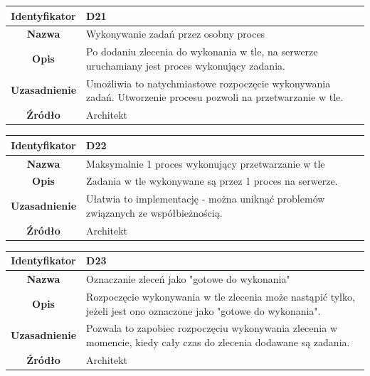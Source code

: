 \begin{table}[H]
\centering
\begin{tabular}{ | >{\bfseries}c | p{11cm} | }
\hline
%
Identyfikator & D21 \\ \hline
Nazwa & Wykonywanie zadań przez osobny proces \\ \hline
Opis & Po dodaniu zlecenia do wykonania w tle, na serwerze uruchamiany jest proces wykonujący zadania. \\ \hline
Uzasadnienie & Umożliwia to natychmiastowe rozpoczęcie wykonywania zadań. Utworzenie procesu pozwoli na przetwarzanie w tle. \\ \hline
Źródło & Architekt \\ \hline
%
\end{tabular}
\end{table}

\begin{table}[H]
\centering
\begin{tabular}{ | >{\bfseries}c | p{11cm} | }
\hline
%
Identyfikator & D22 \\ \hline
Nazwa & Maksymalnie 1 proces wykonujący przetwarzanie w tle \\ \hline
Opis &  	Zadania w tle wykonywane są przez 1 proces na serwerze. \\ \hline
Uzasadnienie & Ułatwia to implementację - można uniknąć problemów związanych ze współbieżnością. \\ \hline
Źródło & Architekt \\ \hline
%
\end{tabular}
\end{table}

\begin{table}[H]
\centering
\begin{tabular}{ | >{\bfseries}c | p{11cm} | }
\hline
%
Identyfikator & D23 \\ \hline
Nazwa &  Oznaczanie zleceń jako "gotowe do wykonania" \\ \hline
Opis & Rozpoczęcie wykonywania w tle zlecenia może nastąpić tylko, jeżeli jest ono oznaczone jako "gotowe do wykonania". \\ \hline
Uzasadnienie & Pozwala to zapobiec rozpoczęciu wykonywania zlecenia w momencie, kiedy cały czas do zlecenia dodawane są zadania. \\ \hline
Źródło & Architekt \\ \hline
%
\end{tabular}
\end{table}

